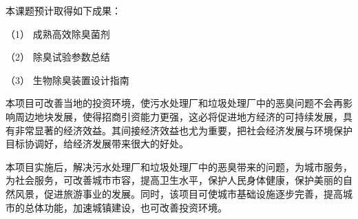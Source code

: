 {}\par
本课题预计取得如下成果：\par
（1）	成熟高效除臭菌剂\par
（2）	除臭试验参数总结\par
（3）	生物除臭装置设计指南\par
{}\par
本项目可改善当地的投资环境，使污水处理厂和垃圾处理厂中的恶臭问题不会再影响周边地块发展，使得招商引资能力更强，这必将促进地方经济的可持续发展，具有非常显著的经济效益。其间接经济效益也尤为重要，把社会经济发展与环境保护目标协调好，给经济发展带来很大的好处。

{}\par
本项目实施后，解决污水处理厂和垃圾处理厂中的恶臭带来的问题，为城市服务，为社会服务，可改善城市市容，提高卫生水平，保护人民身体健康，保护美丽的自然风景，促进旅游事业的发展。同时，该项目可使城市基础设施逐步完善，提高城市的总体功能，加速城镇建设，也可改善投资环境。\par
